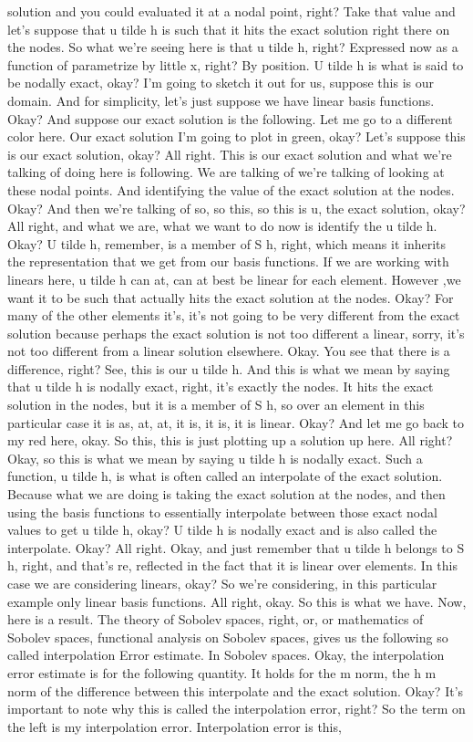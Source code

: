 \documentclass[10pt]{article}
\begin{document}
{solution and you could evaluated it at a nodal point, right? Take that value and let's suppose that u tilde h is such that it hits the exact solution right there on the nodes. So what we're seeing here is that u tilde h, right? Expressed now as a function of parametrize by little x, right? By position. U tilde h is what is said to be nodally exact, okay? I'm going to sketch it out for us, suppose this is our domain. And for simplicity, let's just suppose we have linear basis functions. Okay? And suppose our exact solution is the following. Let me go to a different color here. Our exact solution I'm going to plot in green, okay? Let's suppose this is our exact solution, okay? All right. This is our exact solution and what we're talking of doing here is following. We are talking of we're talking of looking at these nodal points. And identifying the value of the exact solution at the nodes. Okay? And then we're talking of so, so this, so this is u, the exact solution, okay? All right, and what we are, what we want to do now is identify the u tilde h. Okay? U tilde h, remember, is a member of S h, right, which means it inherits the representation that we get from our basis functions. If we are working with linears here, u tilde h can at, can at best be linear for each element. However ,we want it to be such that actually hits the exact solution at the nodes. Okay? For many of the other elements it's, it's not going to be very different from the exact solution because perhaps the exact solution is not too different a linear, sorry, it's not too different from a linear solution elsewhere. Okay. You see that there is a difference, right? See, this is our u tilde h. And this is what we mean by saying that u tilde h is nodally exact, right, it's exactly the nodes. It hits the exact solution in the nodes, but it is a member of S h, so over an element in this particular case it is as, at, at, it is, it is, it is linear. Okay? And let me go back to my red here, okay. So this, this is just plotting up a solution up here. All right? Okay, so this is what we mean by saying u tilde h is nodally exact. Such a function, u tilde h, is what is often called an interpolate of the exact solution. Because what we are doing is taking the exact solution at the nodes, and then using the basis functions to essentially interpolate between those exact nodal values to get u tilde h, okay? U tilde h is nodally exact and is also called the interpolate. Okay? All right. Okay, and just remember that u tilde h belongs to S h, right, and that's re, reflected in the fact that it is linear over elements. In this case we are considering linears, okay? So we're considering, in this particular example only linear basis functions. All right, okay. So this is what we have. Now, here is a result. The theory of Sobolev spaces, right, or, or mathematics of Sobolev spaces, functional analysis on Sobolev spaces, gives us the following so called interpolation Error estimate. In Sobolev spaces. Okay, the interpolation error estimate is for the following quantity. It holds for the m norm, the h m norm of the difference between this interpolate and the exact solution. Okay? It's important to note why this is called the interpolation error, right? So the term on the left is my interpolation error. Interpolation error is this, }
\end{document}

